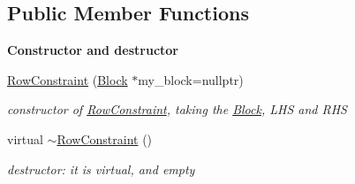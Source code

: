 \subsection*{Public Member Functions}
\begin{Indent}\textbf{ Constructor and destructor}\par
\begin{DoxyCompactItemize}
\item 
\mbox{\hyperlink{class_s_m_spp__di__unipi__it_1_1_row_constraint_a99ba5ca06cbb289d6ca42276abab63ae}{Row\+Constraint}} (\mbox{\hyperlink{class_s_m_spp__di__unipi__it_1_1_block}{Block}} $\ast$my\+\_\+block=nullptr)
\begin{DoxyCompactList}\small\item\em constructor of \mbox{\hyperlink{class_s_m_spp__di__unipi__it_1_1_row_constraint}{Row\+Constraint}}, taking the \mbox{\hyperlink{class_s_m_spp__di__unipi__it_1_1_block}{Block}}, L\+HS and R\+HS \end{DoxyCompactList}\item 
\mbox{\label{class_s_m_spp__di__unipi__it_1_1_row_constraint_ad1f75bf874c8b1ccf3aaa5afdf7ec803}} 
virtual \mbox{\hyperlink{class_s_m_spp__di__unipi__it_1_1_row_constraint_ad1f75bf874c8b1ccf3aaa5afdf7ec803}{$\sim$\+Row\+Constraint}} ()
\begin{DoxyCompactList}\small\item\em destructor\+: it is virtual, and empty \end{DoxyCompactList}\end{DoxyCompactItemize}
\end{Indent}
